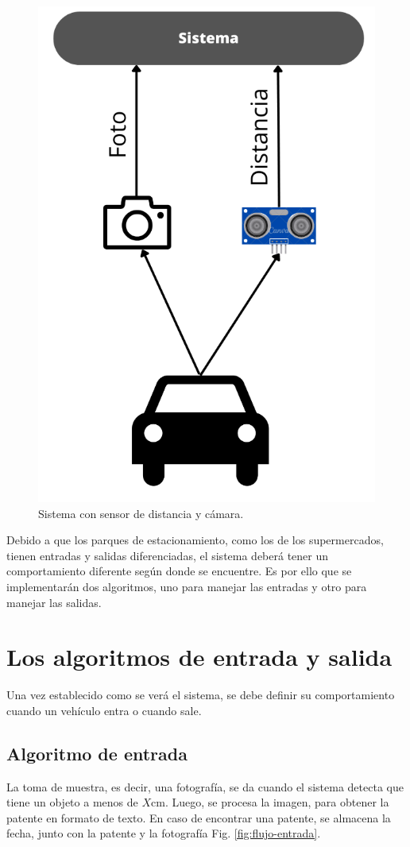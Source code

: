 \begin{figure}
    \centering
    \includegraphics[width=.3\textwidth]{imgs/sistema-con-sensor.png}
    \caption{Sistema con sensor de distancia y cámara.}
    \label{fig:sistema-completa}
\end{figure}

Debido a que los parques de estacionamiento, como los de los supermercados, tienen entradas y salidas diferenciadas, el sistema deberá tener un comportamiento diferente según donde se encuentre.
Es por ello que se implementarán dos algoritmos, uno para manejar las entradas y otro para manejar las salidas.

\section{Los algoritmos de entrada y salida}

Una vez establecido como se verá el sistema, se debe definir su comportamiento cuando un vehículo entra o cuando sale.

\subsection{Algoritmo de entrada}

La toma de muestra, es decir, una fotografía, se da cuando el sistema detecta que tiene un objeto a menos de $X$cm. Luego, se procesa la imagen, para obtener la patente en formato de texto.
En caso de encontrar una patente, se almacena la fecha, junto con la patente y la fotografía Fig. \ref{fig:flujo-entrada}.

